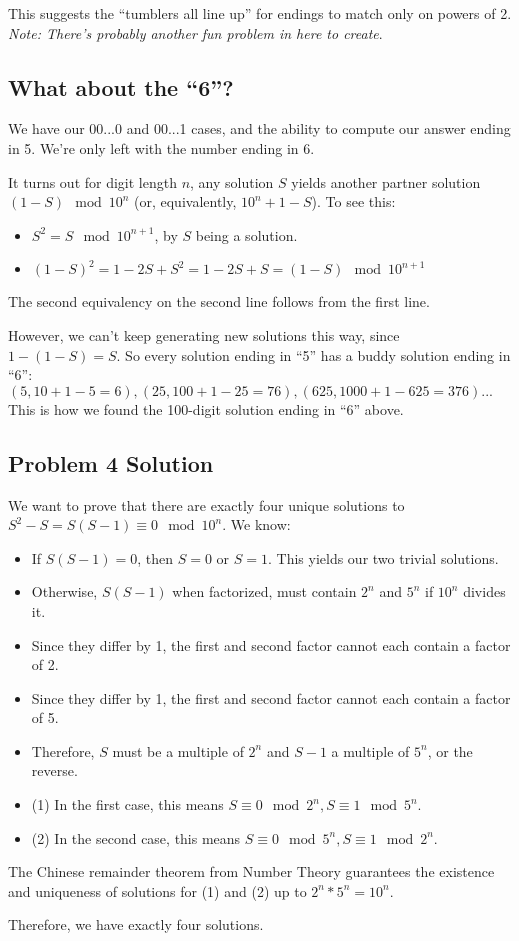 \documentclass[11pt, oneside]{article} 	%
\begin{document}
This suggests the ``tumblers all line up'' for endings to match only on powers of 2.  \emph{Note: There's probably another fun problem in here to create}.

\subsection{What about the ``6''?}

We have our 00...0 and 00...1 cases, and the ability to compute our answer ending in 5.  We're only left with the number ending in 6.

It turns out for digit length $n$, any solution $S$ yields another partner solution $(1 - S) \mod 10^n$ (or, equivalently, $10^n + 1 - S$).  To see this:

\begin{itemize}
\item $S^2 = S  \mod 10^{n+1}$, by $S$ being a solution.
\item $(1-S)^2 = 1-2S+S^2 = 1-2S+S = (1-S) \mod 10^{n+1}$
\end{itemize}

The second equivalency on the second line follows from the first line.

However, we can't keep generating new solutions this way, since $1 - (1 - S) = S$.  So every solution ending in ``5'' has a buddy solution ending in ``6'': $(5, 10 + 1 - 5 = 6), (25, 100 + 1 - 25 = 76), (625, 1000 +1 - 625 = 376)...$ This is how we found the 100-digit solution ending in ``6'' above.

\subsection{Problem 4 Solution}

We want to prove that there are exactly four unique solutions to $S^2 - S = S(S-1) \equiv 0 \mod 10^n$.  We know:

\begin{itemize}
\item If $S(S-1) = 0$, then $S = 0$ or $S = 1$.  This yields our two trivial solutions.
\item Otherwise, $S(S-1)$ when factorized, must contain $2^n$ and $5^n$ if $10^n$ divides it.
\item Since they differ by 1, the first and second factor cannot each contain a factor of 2.
\item  Since they differ by 1, the first and second factor cannot each contain a factor of 5.
\item Therefore, $S$ must be a multiple of $2^n$ and $S-1$ a multiple of $5^n$, or the reverse.
\item (1) In the first case, this means $S \equiv 0 \mod 2^n, S \equiv 1 \mod 5^n$.
\item (2) In the second case, this means $S \equiv 0 \mod 5^n, S \equiv 1 \mod 2^n$.
\end{itemize}

The Chinese remainder theorem from Number Theory guarantees the existence and uniqueness of solutions for (1) and (2) up to $2^n*5^n = 10^n$.

Therefore, we have exactly four solutions.
\end{document}
